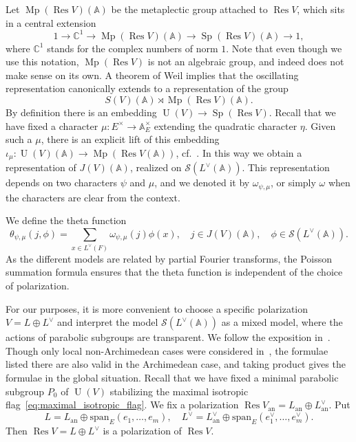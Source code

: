 \documentclass[letterpaper,11pt]{amsart}
\newcommand{\bA}{\mathbb{A}}
\newcommand{\C}{\mathbb{C}}
\newcommand{\cS}{\mathcal{S}}
\newcommand{\<}{\negthickspace}
\DeclareMathOperator{\Sp}{Sp}
\DeclareMathOperator{\Mp}{Mp}
\DeclareMathOperator{\U}{U}
\DeclareMathOperator{\Res}{Res}
\theoremstyle{definition}
\theoremstyle{plain}
\theoremstyle{remark}
\numberwithin{equation}{section}
\begin{document}
Let $\Mp(\Res V)(\bA)$ be the metaplectic group
attached to $\Res V$, which sits in a central extension
    \[
    1 \to \C^1 \to \Mp(\Res V)(\bA) \to \Sp(\Res V)(\bA) \to 1,
    \]
where $\C^1$ stands for the complex numbers of norm $1$.
Note that even though we use this notation, $\Mp(\Res V)$ is not an algebraic
group, and indeed does not make sense on its own. A theorem of Weil implies
that the oscillating representation canonically extends to a representation
of the group
    \[
    S(V)(\bA) \rtimes \Mp(\Res V)(\bA).
    \]
By definition there is an embedding $\U(V) \to \Sp(\Res V)$. Recall that we
have fixed a character $\mu:E^\times \to \bA_E^\times$ extending the
quadratic character $\eta$. Given such a $\mu$, there is an explicit lift of
this embedding $\iota_{\mu}: \U(V)(\bA) \to \Mp(\Res V(\bA))$, cf.~\cite{Kudla}.
In this way we obtain a representation of $J(V)(\bA)$, realized on
$\cS(L^\vee(\bA))$. This representation depends on two characters $\psi$ and
$\mu$, and we denoted it by $\omega_{\psi, \mu}$, or simply $\omega$ when the
characters are clear from the context.

We define the theta function
\begin{equation}
    \label{eq:Theta_unitary_definition}
     \theta_{\psi, \mu}(j, \phi) = \sum_{x \in L^\vee(F)}
    \omega_{\psi, \mu}(j) \phi(x), \quad j \in J(V)(\bA), \quad
    \phi \in \cS(L^\vee(\bA)).
\end{equation}
As the different models are related by partial Fourier transforms, the Poisson summation formula ensures that the theta function is independent of the choice of polarization.

For our purposes, it is more convenient to choose a specific polarization $V=L\oplus L^\vee$ and interpret the model
$\cS(L^\vee(\bA))$ as a mixed model,
where the actions of parabolic subgroups are transparent. We follow the exposition
in~\cite{GI2}. Though only local non-Archimedean cases were considered in~\cite{GI2}, the
formulae listed there are also valid in the Archimedean case, and taking product
gives the formulae in the global situation. Recall
that we have fixed a minimal parabolic subgroup $P_{0}$ of $\U(V)$
stabilizing the maximal isotropic flag~\eqref{eq:maximal_isotropic_flag}. We fix a polarization $\Res V_{\mathrm{an}} = L_{\mathrm{an}} \oplus L_{\mathrm{an}}^\vee$. Put
\[
     L = L_{\mathrm{an}} \oplus \mathrm{span}_E(e_1,\hdots,e_m), \quad L^\vee = L_{\mathrm{an}}^\vee \oplus \mathrm{span}_E (e_1^\vee,\hdots,e_m^\vee).
\]
Then $\Res V
= L \oplus L^\vee$ is a polarization of $\Res V$.
\end{document}
